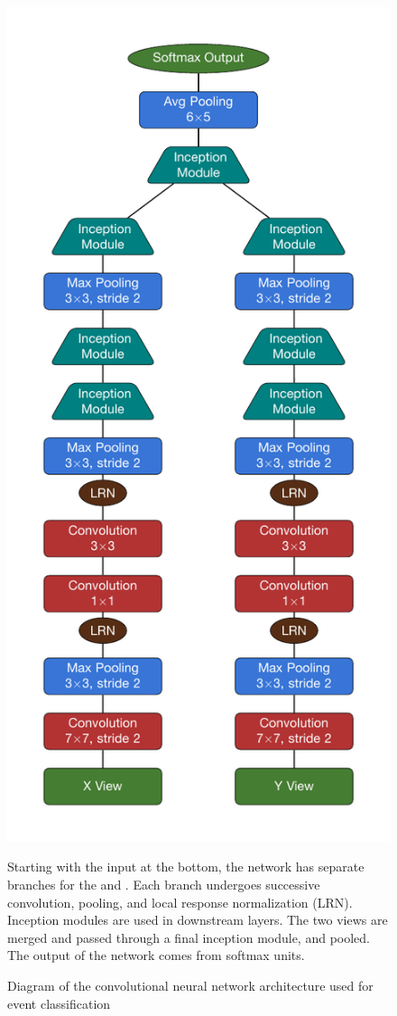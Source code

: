 \begin{figure}
\begin{center}
\includegraphics[height=0.8\textheight]{figures/arch/arch.pdf}
\end{center}
\caption{Diagram of the convolutional neural network architecture used
for event classification}{Starting with the input at the bottom,
the network has separate branches for the \xview and \yview.
Each branch undergoes successive convolution, pooling, and
local response normalization (LRN).  Inception modules are used in downstream layers.
The two views are merged and passed through a final inception module, and
pooled.  The output of the network comes from softmax units.
}
\label{arch}
\end{figure}


